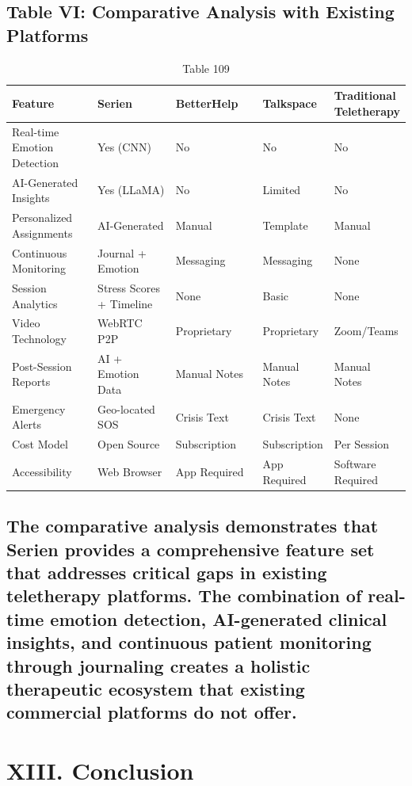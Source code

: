 \documentclass[conference]{IEEEtran}
\begin{document}
\subsection{Table VI: Comparative Analysis with Existing Platforms}
\begin{table}[t]
\centering
\caption{Table 109}
\begin{tabular}{|p{0.3\linewidth}|p{0.3\linewidth}|p{0.3\linewidth}|p{0.3\linewidth}|p{0.3\linewidth}|}
\hline
Feature & Serien & BetterHelp & Talkspace & Traditional Teletherapy \\
\hline
Real-time Emotion Detection & Yes (CNN) & No & No & No \\
\hline
AI-Generated Insights & Yes (LLaMA) & No & Limited & No \\
\hline
Personalized Assignments & AI-Generated & Manual & Template & Manual \\
\hline
Continuous Monitoring & Journal + Emotion & Messaging & Messaging & None \\
\hline
Session Analytics & Stress Scores + Timeline & None & Basic & None \\
\hline
Video Technology & WebRTC P2P & Proprietary & Proprietary & Zoom/Teams \\
\hline
Post-Session Reports & AI + Emotion Data & Manual Notes & Manual Notes & Manual Notes \\
\hline
Emergency Alerts & Geo-located SOS & Crisis Text & Crisis Text & None \\
\hline
Cost Model & Open Source & Subscription & Subscription & Per Session \\
\hline
Accessibility & Web Browser & App Required & App Required & Software Required \\
\hline
\end{tabular}
\end{table}
\subsection{The comparative analysis demonstrates that Serien provides a comprehensive feature set that addresses critical gaps in existing teletherapy platforms. The combination of real-time emotion detection, AI-generated clinical insights, and continuous patient monitoring through journaling creates a holistic therapeutic ecosystem that existing commercial platforms do not offer.}
\section{XIII. Conclusion}
\end{document}
